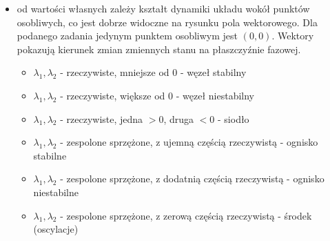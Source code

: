 \documentclass[a4paper, 12pt]{article}
\begin{document}
	\begin{itemize}
		\item od wartości własnych zależy kształt dynamiki układu wokół punktów osobliwych, co jest dobrze widoczne na rysunku pola wektorowego. Dla podanego zadania jedynym punktem osobliwym jest $(0,0)$. Wektory pokazują kierunek zmian zmiennych stanu na płaszczyźnie fazowej.
		\begin{itemize}
			\item $\lambda _1, \lambda _2$ - rzeczywiste, mniejsze od 0 - węzeł stabilny
			\item $\lambda _1, \lambda _2$ - rzeczywiste, większe od 0 - węzeł niestabilny
			\item $\lambda _1, \lambda _2$ - rzeczywiste, jedna $>0$, druga $<0$ - siodło
			\item $\lambda _1, \lambda _2$ - zespolone sprzężone, z ujemną częścią rzeczywistą - ognisko stabilne
			\item $\lambda _1, \lambda _2$ - zespolone sprzężone, z dodatnią częścią rzeczywistą - ognisko niestabilne
			\item $\lambda _1, \lambda _2$ - zespolone sprzężone, z zerową częścią rzeczywistą - środek (oscylacje)
		\end{itemize}
		\begin{figure}[h]
			\begin{center}

\end{center}
\end{figure}
\end{itemize}
\end{document}
